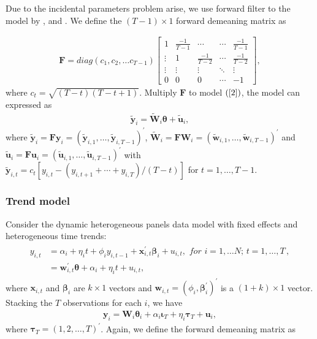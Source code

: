 \documentclass[12pt,a4paper,hyperref]{article}
\begin{document}
Due to the incidental parameters problem arise, we use forward filter to the model by \citet{Moon:2000}, \citet{Hayakawa:2009} and \citet{Hayakawa:2019}. We define the $\left(T-1 \right) \times 1$ forward demeaning matrix as

\begin{align}
\boldsymbol{F}=diag(c_{1}, c_{2}, \ldots c_{T-1})
\begin{bmatrix}
1 & \frac{-1}{T-1} & \cdots & \cdots & \frac{-1}{T-1}\\
\vdots & 1 & \frac{-1}{T-2} & \cdots & \frac{-1}{T-2}\\
\vdots & \vdots & \vdots & \ddots & \vdots \\
0 & 0 & 0 & \cdots & -1 
\end{bmatrix},
\end{align}    
where $c_{t}=\sqrt{\left( T-t\right)\left( T-t+1\right) }$.
Multiply $\boldsymbol{F}$ to model $(\ref{2})$, the model can expressed as  
\begin{align}
\tilde{\boldsymbol{y}}_{i}= \tilde{\boldsymbol{W}}_{i}\boldsymbol{\theta}+\tilde{\boldsymbol{u}}_{i},
\end{align}
where $\tilde{\boldsymbol{y}}_{i}=\boldsymbol{F}\boldsymbol{y}_{i}= \left(\tilde{\boldsymbol{y}}_{i,1}, \ldots, \tilde{\boldsymbol{y}}_{i,T-1} \right)^{'}$,  $\tilde{\boldsymbol{W}}_{i}=\boldsymbol{F}\boldsymbol{W}_{i}= \left(\tilde{\boldsymbol{w}}_{i,1}, \ldots, \tilde{\boldsymbol{w}}_{i,T-1} \right)^{'}$ and $\tilde{\boldsymbol{u}}_{i}=\boldsymbol{F}\boldsymbol{u}_{i}= \left(\tilde{\boldsymbol{u}}_{i,1}, \ldots, \tilde{\boldsymbol{u}}_{i,T-1} \right)^{'}$ with $\tilde{\boldsymbol{y}}_{i,t}=c_{t}\left[y_{i,t}-\left(y_{i,t+1}+\cdots+y_{i,T} \right)/\left(T-t \right) \right]$ for $t=1, \ldots, T-1.$


\subsubsection{Trend model}
Consider the dynamic heterogeneous panels data model with fixed effects and heterogeneous time trends:
\begin{align}
\begin{split}
y_{i,t}&=\alpha_{i}+\eta_{i}t +\phi_{i} y_{i,t-1}+ \boldsymbol{x}^{'}_{i,t}\boldsymbol{\beta}_{i}+u_{i,t}, \,\, for\,\,i=1,\ldots N;\,t=1,\ldots,T\, , \\
&= \boldsymbol{w}^{'}_{i,t}\boldsymbol{\theta}+ \alpha_{i}+\eta_{i}t+u_{i,t}, 
\end{split}
\end{align}
where $\boldsymbol{x}_{i,t}$ and $\boldsymbol{\beta}_{i}$ are $k \times 1$ vectors and $\boldsymbol{w}_{i,t}=\left(\phi_{i}, \boldsymbol{\beta}^{'}_{i} \right)^{'}$ is a $\left(1+k\right) \times 1$ vector.
Stacking the $T$ observations for each $i$, we have
\begin{align}
\boldsymbol{y}_{i}=\boldsymbol{W}_{i}\boldsymbol{\theta}_{i}+ \alpha_{i}\boldsymbol{\iota}_{T}+\eta_{i}\boldsymbol{\tau}_{T} + \boldsymbol{u}_{i}, \label{6}
\end{align}
where $\boldsymbol{\tau}_{T}=\left(1, 2, \ldots, T \right)^{'}$. Again, we define the forward demeaning matrix as
\end{document}
